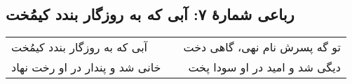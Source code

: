 \begin{center}
\section*{رباعی شمارهٔ ۷: آبی که به روزگار بندد کیمُخت}
\label{sec:007}
\begin{longtable}{l p{0.5cm} r}
آبی که به روزگار بندد کیمُخت
&&
تو گه پسرش نام نهی، گاهی دخت
\\
خانی شد و پندار در او رخت نهاد
&&
دیگی شد و امید در او سودا پخت
\\
\end{longtable}
\end{center}
